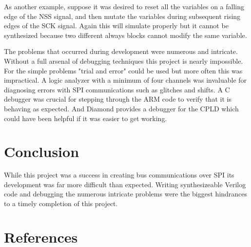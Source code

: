 \documentclass{article}
\begin{document}
As another example, suppose it was desired to reset all the variables on
a falling edge of the NSS signal, and then mutate the variables during
subsequent rising edges of the SCK signal.
Again this will simulate properly but it cannot be synthesized because
two different always blocks cannot modify the same variable.

The problems that occurred during development were numerous and intricate.
Without a full arsenal of debugging techniques this project is nearly impossible.
For the simple problems "trial and error" could be used but more
often this was impractical.
A logic analyzer with a minimum of four channels was invaluable for
diagnosing errors with SPI communications such as glitches and shifts.
A C debugger was crucial for stepping through the ARM code
to verify that it is behaving as expected.
And Diamond provides a debugger for the CPLD which could have
been helpful if it was easier to get working.


\section{Conclusion}

While this project was a success in creating bus communications over SPI
its development was far more difficult than expected.
Writing synthesizeable Verilog code and debugging the numerous intricate
problems were the biggest hindrances to a timely completion of this project.


\clearpage

\pagebreak
\renewcommand*{\refname}{\vspace{-8mm}}
\section{References}
%


\end{document}

